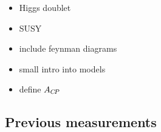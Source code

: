 



{\color{Red}
\begin{itemize}
\item Higgs doublet
\item SUSY 
\item include feynman diagrams
\item small intro into models
\item define $A_{{C\!P}}$
\end{itemize}}

\subsection{Previous measurements}

